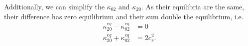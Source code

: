 Additionally, we can simplify the $\kappa_{02}$ and $\kappa_{20}$.
As their equilibria are the same, their difference has zero equilibrium and their sum double the equilibrium, i.e.
\begin{equation}
  \begin{aligned}
    \kappa_{20}^{eq} - \kappa_{02}^{eq} & = 0  \\
    \kappa_{20}^{eq} + \kappa_{02}^{eq} & = 2 c_s^2.
  \end{aligned}
\end{equation}
